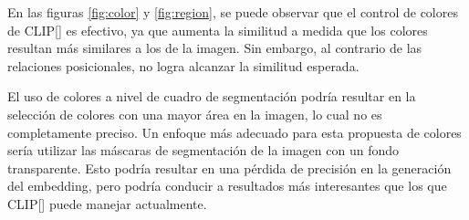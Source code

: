 
En las figuras \ref{fig:color} y \ref{fig:region}, se puede observar que el control de colores de CLIP[\cite{clip}]  es efectivo, ya que aumenta la similitud a medida que los colores resultan más similares a los de la imagen. Sin embargo, al contrario de las relaciones posicionales, no logra alcanzar la similitud esperada.

El uso de colores a nivel de cuadro de segmentación podría resultar en la selección de colores con una mayor área en la imagen, lo cual no es completamente preciso. Un enfoque más adecuado para esta propuesta de colores sería utilizar las máscaras de segmentación de la imagen con un fondo transparente. Esto podría resultar en una pérdida de precisión en la generación del embedding, pero podría conducir a resultados más interesantes que los que CLIP[\cite{clip}] puede manejar actualmente.


